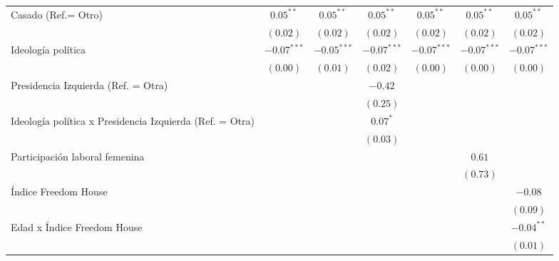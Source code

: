 \documentclass[
  12pt,
  a4paper,
]{article}
\begin{document}
\begin{table}[h!]
\begin{center}
{\begin{threeparttable}
\begin{tabular}{l c c c c c c}
Casado (Ref.= Otro)                                      & $0.05^{**}$   & $0.05^{**}$   & $0.05^{**}$   & $0.05^{**}$   & $0.05^{**}$   & $0.05^{**}$   \\
                                                         & $(0.02)$      & $(0.02)$      & $(0.02)$      & $(0.02)$      & $(0.02)$      & $(0.02)$      \\
Ideología política                                       & $-0.07^{***}$ & $-0.05^{***}$ & $-0.07^{***}$ & $-0.07^{***}$ & $-0.07^{***}$ & $-0.07^{***}$ \\
                                                         & $(0.00)$      & $(0.01)$      & $(0.02)$      & $(0.00)$      & $(0.00)$      & $(0.00)$      \\
Presidencia Izquierda (Ref. = Otra)                      &               &               & $-0.42$       &               &               &               \\
                                                         &               &               & $(0.25)$      &               &               &               \\
Ideología política x Presidencia Izquierda (Ref. = Otra) &               &               & $0.07^{*}$    &               &               &               \\
                                                         &               &               & $(0.03)$      &               &               &               \\
Participación laboral femenina                           &               &               &               &               & $0.61$        &               \\
                                                         &               &               &               &               & $(0.73)$      &               \\
Índice Freedom House                                     &               &               &               &               &               & $-0.08$       \\
                                                         &               &               &               &               &               & $(0.09)$      \\
Edad x Índice Freedom House                              &               &               &               &               &               & $-0.04^{**}$  \\
                                                         &               &               &               &               &               & $(0.01)$      \\

\end{tabular}
\end{threeparttable}}
\end{center}
\end{table}
\end{document}
